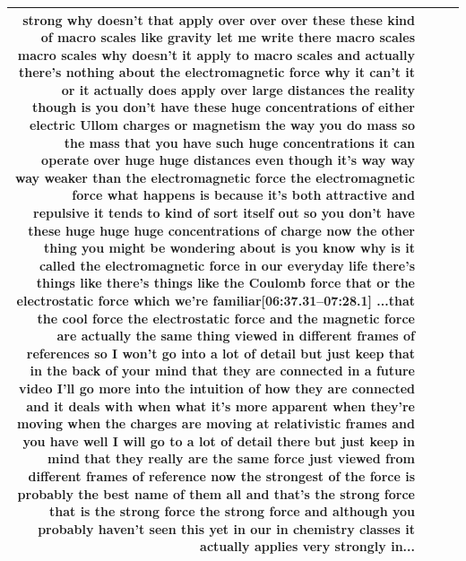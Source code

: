 \documentclass[10pt]{article}
\begin{document}
\begin{tiny}
\begin{longtable}{|r|p{0.375in}|p{1.275in}|p{3.5in}|}
strong why doesn't that apply over over over these these kind of macro scales like gravity let me write there macro scales macro scales why doesn't it apply to macro scales and actually there's nothing about the electromagnetic force why it can't it or it actually does apply over large distances the reality though is you don't have these huge concentrations of either electric Ullom charges or magnetism the way you do mass so the mass that you have such huge concentrations it can operate over huge huge distances even though it's way way way weaker than the electromagnetic force the electromagnetic force what happens is because it's both attractive and repulsive it tends to kind of sort itself out so you don't have these huge huge huge concentrations of charge now the other thing you might be wondering about is you know why is it called the electromagnetic force in our everyday life there's things like there's things like the Coulomb force that or the electrostatic force which we're familiar\newline\textbf{[06:37.31--07:28.1]} ...that the cool force the electrostatic force and the magnetic force are actually the same thing viewed in different frames of references so I won't go into a lot of detail but just keep that in the back of your mind that they are connected in a future video I'll go more into the intuition of how they are connected and it deals with when what it's more apparent when they're moving when the charges are moving at relativistic frames and you have well I will go to a lot of detail there but just keep in mind that they really are the same force just viewed from different frames of reference now the strongest of the force is probably the best name of them all and that's the strong force that is the strong force the strong force and although you probably haven't seen this yet in our in chemistry classes it actually applies very strongly in... \\\hline

\end{longtable}
\end{tiny}
\end{document}
